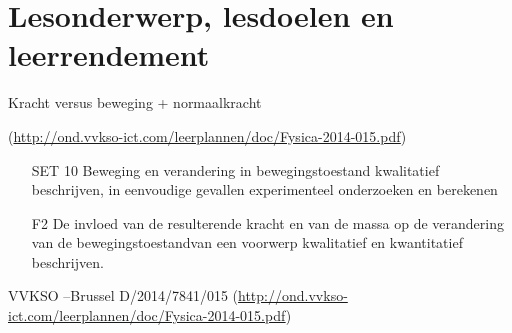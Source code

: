 \section{Lesonderwerp, lesdoelen en leerrendement}
 Kracht versus beweging + normaalkracht

(\url{http://ond.vvkso-ict.com/leerplannen/doc/Fysica-2014-015.pdf})

\begin{enumerate}[align=left]
    \item[SET 10]{Beweging  en  verandering  in  bewegingstoestand  kwalitatief  beschrijven,  in  eenvoudige  gevallen  experimenteel  onderzoeken  en berekenen}
    \item[F2]{De invloed van de resulterende kracht en van de massa op de verandering van de bewegingstoestandvan een voorwerp kwalitatief en kwantitatief beschrijven.}
\end{enumerate}

VVKSO –Brussel D/2014/7841/015 
(\url{http://ond.vvkso-ict.com/leerplannen/doc/Fysica-2014-015.pdf})

